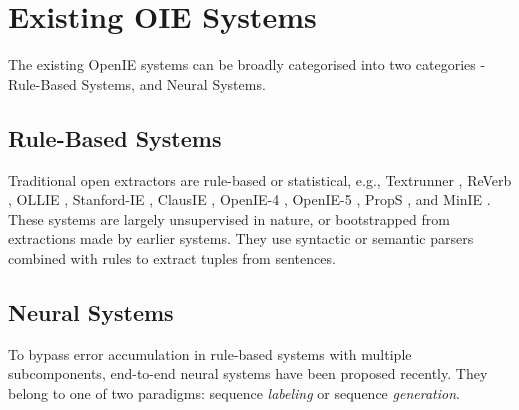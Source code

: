 \section{Existing OIE Systems}

    The existing OpenIE systems can be broadly categorised into two categories - Rule-Based Systems, and Neural Systems.

    \subsection{Rule-Based Systems}
        Traditional open extractors are rule-based or statistical, e.g., Textrunner \cite{banko&al07}, ReVerb \cite{Fader&al11,etzioni-ijcai11}, OLLIE \cite{Mausam&al12}, Stanford-IE \cite{angeli&al15}, ClausIE \cite{corro&al13}, OpenIE-4 \cite{christensen&al11,pal&al16}, OpenIE-5 \cite{Saha&al2017, Saha2018OpenIE}, PropS \cite{Stanovsky&al2016}, and MinIE \cite{gashteovski&al17}. These systems are largely unsupervised in nature, or bootstrapped from extractions made by earlier systems. They use syntactic or semantic parsers combined with rules to extract tuples from sentences.


    \subsection{Neural Systems}
        To bypass error accumulation in rule-based systems with multiple subcomponents, end-to-end neural systems have been proposed recently. They belong to one of two paradigms: sequence \textit{labeling} or sequence \textit{generation}.

